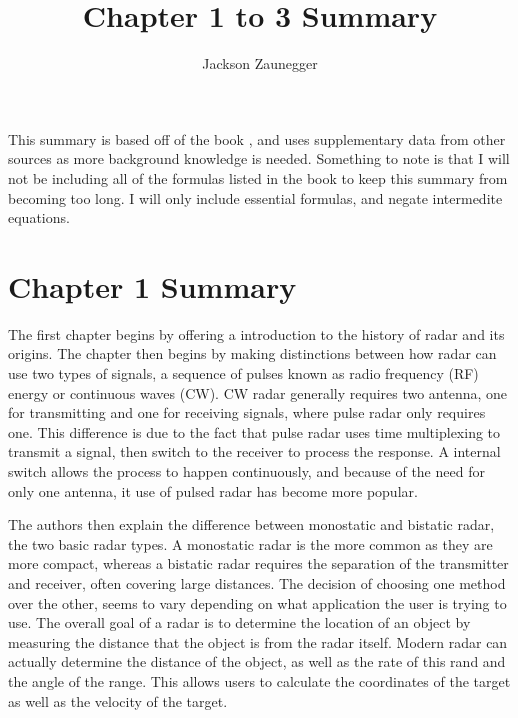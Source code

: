 \documentclass[12pt]{article}
\begin{document}
\title{Chapter 1 to 3 Summary}
\author{Jackson Zaunegger}
\date{}
\maketitle

\pagebreak
This summary is based off of the book \cite{BRA}, and uses supplementary data from other sources as more background knowledge is needed. Something to note is that I will not be including all of the formulas listed in the book to keep this summary from becoming too long. I will only include essential formulas, and negate intermedite equations. 
\tableofcontents

\pagebreak
\section{Chapter 1 Summary}

The first chapter begins by offering a introduction to the history of radar and its origins. The chapter then begins by making distinctions between how radar can use two types of signals, a sequence of pulses known as radio frequency (RF) energy or continuous waves (CW). CW radar generally requires two antenna, one for transmitting and one for receiving signals, where pulse radar only requires one. This difference is due to the fact that pulse radar uses time multiplexing to transmit a signal, then switch to the receiver to process the response. A internal switch allows the process to happen continuously, and because of the need for only one antenna, it use of pulsed radar has become more popular. 

The authors then explain the difference between monostatic and bistatic radar, the two basic radar types. A monostatic radar is the more common as they are more compact, whereas a bistatic radar requires the separation of the transmitter and receiver, often covering large distances. The decision of choosing one method over the other, seems to vary depending on what application the user is trying to use. The overall goal of a radar is to determine the location of an object by measuring the distance that the object is from the radar itself. Modern radar can actually determine the distance of the object, as well as the rate of this rand and the angle of the range. This allows users to calculate the coordinates of the target as well as the velocity of the target. 
\end{document}
